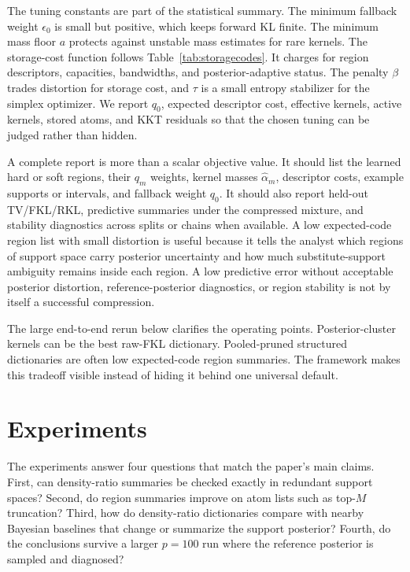 \documentclass[twoside,11pt]{article}
\begin{document}
The tuning constants are part of the statistical summary. The minimum fallback weight \(\epsilon_0\) is small but positive, which keeps forward KL finite. The minimum mass floor \(a\) protects against unstable mass estimates for rare kernels. The storage-cost function follows Table~\ref{tab:storagecodes}. It charges for region descriptors, capacities, bandwidths, and posterior-adaptive status. The penalty \(\beta\) trades distortion for storage cost, and \(\tau\) is a small entropy stabilizer for the simplex optimizer. We report \(q_0\), expected descriptor cost, effective kernels, active kernels, stored atoms, and KKT residuals so that the chosen tuning can be judged rather than hidden.

A complete report is more than a scalar objective value. It should list the learned hard or soft regions, their \(q_m\) weights, kernel masses \(\widehat\alpha_m\), descriptor costs, example supports or intervals, and fallback weight \(q_0\). It should also report held-out TV/FKL/RKL, predictive summaries under the compressed mixture, and stability diagnostics across splits or chains when available. A low expected-code region list with small distortion is useful because it tells the analyst which regions of support space carry posterior uncertainty and how much substitute-support ambiguity remains inside each region. A low predictive error without acceptable posterior distortion, reference-posterior diagnostics, or region stability is not by itself a successful compression.

The large end-to-end rerun below clarifies the operating points. Posterior-cluster kernels can be the best raw-FKL dictionary. Pooled-pruned structured dictionaries are often low expected-code region summaries. The framework makes this tradeoff visible instead of hiding it behind one universal default.

\section{Experiments}
\label{sec:leanmainexperiments}

The experiments answer four questions that match the paper's main claims. First, can density-ratio summaries be checked exactly in redundant support spaces? Second, do region summaries improve on atom lists such as top-\(M\) truncation? Third, how do density-ratio dictionaries compare with nearby Bayesian baselines that change or summarize the support posterior? Fourth, do the conclusions survive a larger \(p=100\) run where the reference posterior is sampled and diagnosed?
\end{document}

